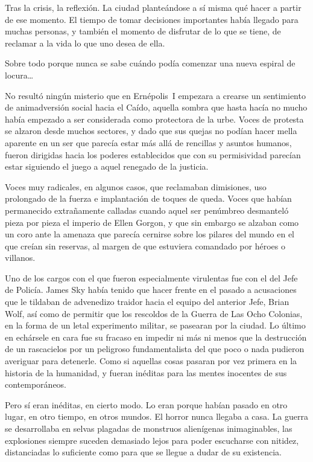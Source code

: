 Tras la crisis, la reflexión. La ciudad planteándose a sí misma qué hacer a partir de ese momento. El tiempo de tomar decisiones importantes había llegado para muchas personas, y también el momento de disfrutar de lo que se tiene, de reclamar a la vida lo que uno desea de ella.

Sobre todo porque nunca se sabe cuándo podía comenzar una nueva espiral de locura\dots

\fancyparbreak
No resultó ningún misterio que en Ernépolis~I empezara a crearse un sentimiento de animadversión social hacia el Caído, aquella sombra que hasta hacía no mucho había empezado a ser considerada como protectora de la urbe. Voces de protesta se alzaron desde muchos sectores, y dado que sus quejas no podían hacer mella aparente en un ser que parecía estar más allá de rencillas y asuntos humanos, fueron dirigidas hacia los poderes establecidos que con su permisividad parecían estar siguiendo el juego a aquel renegado de la justicia.

Voces muy radicales, en algunos casos, que reclamaban dimisiones, uso prolongado de la fuerza e implantación de toques de queda. Voces que habían permanecido extrañamente calladas cuando aquel ser penúmbreo desmanteló pieza por pieza el imperio de Ellen Gorgon, y que sin embargo se alzaban como un coro ante la amenaza que parecía cernirse sobre los pilares del mundo en el que creían sin reservas, al margen de que estuviera comandado por héroes o villanos.

Uno de los cargos con el que fueron especialmente virulentas fue con el del Jefe de Policía. James Sky había tenido que hacer frente en el pasado a acusaciones que le tildaban de advenedizo traidor hacia el equipo del anterior Jefe, Brian Wolf, así como de permitir que los rescoldos de la Guerra de Las Ocho Colonias, en la forma de un letal experimento militar, se pasearan por la ciudad. Lo último en echársele en cara fue su fracaso en impedir ni más ni menos que la destrucción de un rascacielos por un peligroso fundamentalista del que poco o nada pudieron averiguar para detenerle. Como si aquellas cosas pasaran por vez primera en la historia de la humanidad, y fueran inéditas para las mentes inocentes de sus contemporáneos.

Pero sí eran inéditas, en cierto modo. Lo eran porque habían pasado en otro lugar, en otro tiempo, en otros mundos. El horror nunca llegaba a casa. La guerra se desarrollaba en selvas plagadas de monstruos alienígenas inimaginables, las explosiones siempre suceden demasiado lejos para poder escucharse con nitidez, distanciadas lo suficiente como para que se llegue a dudar de su existencia.

